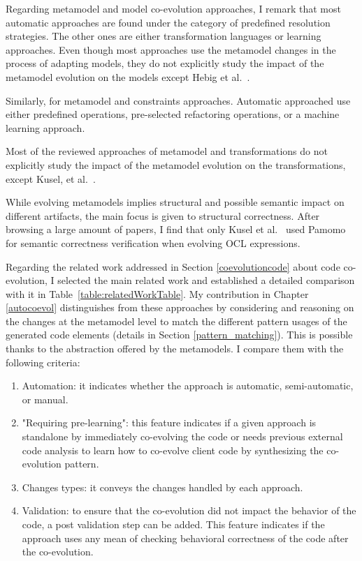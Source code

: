   Regarding metamodel and model co-evolution approaches, I remark that most automatic approaches are found under the category of predefined resolution strategies. The other ones are either transformation languages or learning approaches. Even though most approaches use the metamodel changes in the process of adapting models, they do not explicitly study the impact of the metamodel evolution on the models except Hebig et al.~\cite{hebig2016approaches}.
  
  Similarly, for metamodel and constraints approaches.
  Automatic approached use either predefined operations, pre-selected refactoring operations, or a machine learning approach.
  
 
  Most of the reviewed approaches of metamodel and transformations do not explicitly study the impact of the metamodel evolution on the transformations, except Kusel, et al.~\cite{kusel2015consistent}.
  
  While evolving metamodels implies structural and possible semantic impact on different artifacts, the main focus is given to structural correctness. After browsing a large amount of papers, I find that only Kusel et al.~\cite{kusel2015systematic} used Pamomo~\cite{10.1007/s10515-012-0102-y} for semantic correctness verification when evolving OCL expressions.
  
  Regarding the related work addressed in Section \ref{coevolutioncode} about code co-evolution, I selected the main related work and established a detailed comparison with it in Table~\ref{table:relatedWorkTable}. My contribution in Chapter \ref{autocoevol} distinguishes from these approaches by considering and reasoning on the changes at the metamodel level to match the different pattern usages of the generated code elements (details in Section \ref{pattern_matching}). This is possible thanks to the abstraction offered by the metamodels. 
  I compare them with the following criteria: %
  
  \begin{enumerate}
  	
  	\item Automation: it indicates whether the approach is automatic, semi-automatic, or manual.
  	\item "Requiring pre-learning": 
  	this feature indicates if a given approach is standalone by immediately co-evolving the code or needs previous external code analysis to learn how to co-evolve client code by synthesizing the co-evolution pattern.
  	\item Changes types: it conveys the changes handled by each approach.
  	\item Validation: to ensure that the co-evolution did not impact the behavior of the code, a post validation step can be added. This feature indicates if the approach uses any mean of checking behavioral correctness of the code after the co-evolution.
  
  \end{enumerate}
  
